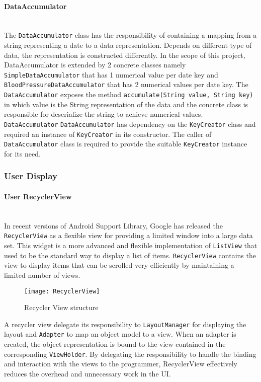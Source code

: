 \paragraph{DataAccumulator}\mbox{} \\
The \texttt{DataAccumulator} class has the responsibility of containing a mapping from a string representing a date to a
data representation. Depends on different type of data, the representation is constructed differently. In the scope of
this project, DataAccumulator is extended by 2 concrete classes namely \texttt{SimpleDataAccumulator} that has 1
numerical value per date key and \texttt{BloodPressureDataAccumulator} that has 2 numerical values per date key. The
\texttt{DataAccumulator} exposes the method \texttt{accumulate(String value, String key)} in which value is the String
representation of the data and the concrete class is responsible for deserialize the string to achieve numerical values.
\texttt{DataAccumulator}
\texttt{DataAccumulator} has dependency on the \texttt{KeyCreator} class and required an instance of \texttt{KeyCreator}
in its constructor. The caller of \texttt{DataAccumulator} class is required to provide the suitable \texttt{KeyCreator}
instance for its need.

\subsubsection{User Display}
\paragraph{User RecyclerView} \mbox{} \\
In recent versions of Android Support Library, Google has released the \texttt{RecyclerView} as a flexible view for
providing a limited window into a large data set. This widget is a more advanced and flexible implementation of
\texttt{ListView} that used to be the standard way to display a list of items. \texttt{RecyclerView} contains the view
to display items that can be scrolled very efficiently by maintaining a limited number of views\cite{RecyclerView}.
\begin{figure}[h]
    \centering
    \texttt{[image: RecyclerView]}
    \caption{Recycler View structure}
\end{figure}
A recycler view delegate its responsibility to \texttt{LayoutManager} for displaying the layout and \texttt{Adapter} to
map an object model to a view. When an adapter is created, the object representation is bound to the view contained in
the corresponding \texttt{ViewHolder}. By delegating the responsibility to handle the binding and interaction with the
views to the programmer, RecyclerView effectively reduces the overhead and unnecessary work in the UI.

